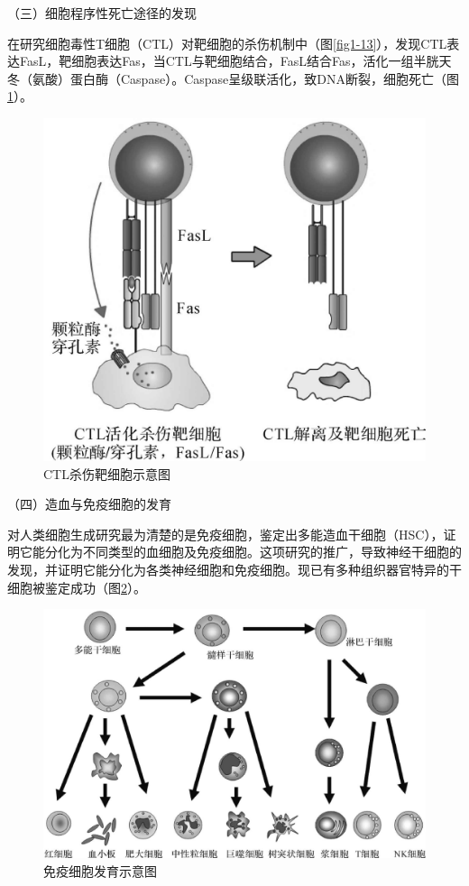 （三）细胞程序性死亡途径的发现

在研究细胞毒性T细胞（CTL）对靶细胞的杀伤机制中（图\ref{fig1-13}），发现CTL表达FasL，靶细胞表达Fas，当CTL与靶细胞结合，FasL结合Fas，活化一组半胱天冬（氨酸）蛋白酶（Caspase）。Caspase呈级联活化，致DNA断裂，细胞死亡（图\ref{fig1-14}）。

\begin{figure}[!htbp]
 \centering
 \includegraphics[scale=1.1]{./images/Image00021.jpg}
 \caption{CTL杀伤靶细胞示意图}
 \label{fig1-14}
  \end{figure} 

（四）造血与免疫细胞的发育

对人类细胞生成研究最为清楚的是免疫细胞，鉴定出多能造血干细胞（HSC），证明它能分化为不同类型的血细胞及免疫细胞。这项研究的推广，导致神经干细胞的发现，并证明它能分化为各类神经细胞和免疫细胞。现已有多种组织器官特异的干细胞被鉴定成功（图\ref{fig1-15}）。

\begin{figure}[!htbp]
 \centering
 \includegraphics[width=.7\textwidth]{./images/Image00022.jpg}
 \caption{免疫细胞发育示意图}
 \label{fig1-15}
  \end{figure} 


